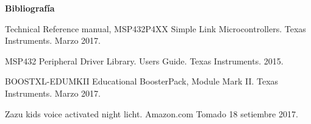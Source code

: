 \textbf{ Bibliografía}

Technical Reference manual, MSP432P4XX Simple Link Microcontrollers. Texas Instruments. Marzo 2017.

MSP432 Peripheral Driver Library. Users Guide. Texas Instruments. 2015.

BOOSTXL-EDUMKII Educational BoosterPack, Module Mark II. Texas Instruments. Marzo 2017.

Zazu kids voice activated night licht. Amazon.com Tomado 18 setiembre 2017.

%
%
